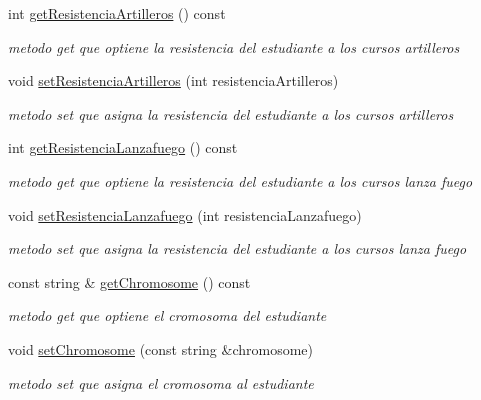 \begin{DoxyCompactItemize}
\mbox{\label{classEstudiantes_a4ee2603cd3b3ea6021ae72384f4a258f}} 
int \hyperlink{classEstudiantes_a4ee2603cd3b3ea6021ae72384f4a258f}{get\+Resistencia\+Artilleros} () const
\begin{DoxyCompactList}\small\item\em metodo get que optiene la resistencia del estudiante a los cursos artilleros \end{DoxyCompactList}\item 
\mbox{\label{classEstudiantes_a55e46054c075209ae207dfac6b3e2054}} 
void \hyperlink{classEstudiantes_a55e46054c075209ae207dfac6b3e2054}{set\+Resistencia\+Artilleros} (int resistencia\+Artilleros)
\begin{DoxyCompactList}\small\item\em metodo set que asigna la resistencia del estudiante a los cursos artilleros \end{DoxyCompactList}\item 
\mbox{\label{classEstudiantes_afbffcf98ee6826174f38453936b93b27}} 
int \hyperlink{classEstudiantes_afbffcf98ee6826174f38453936b93b27}{get\+Resistencia\+Lanzafuego} () const
\begin{DoxyCompactList}\small\item\em metodo get que optiene la resistencia del estudiante a los cursos lanza fuego \end{DoxyCompactList}\item 
\mbox{\label{classEstudiantes_a2ba90eee4a78a334efa5ec0e4b6d427c}} 
void \hyperlink{classEstudiantes_a2ba90eee4a78a334efa5ec0e4b6d427c}{set\+Resistencia\+Lanzafuego} (int resistencia\+Lanzafuego)
\begin{DoxyCompactList}\small\item\em metodo set que asigna la resistencia del estudiante a los cursos lanza fuego \end{DoxyCompactList}\item 
\mbox{\label{classEstudiantes_a74d16f90ce99a2a166e2eb8cdc3f77b5}} 
const string \& \hyperlink{classEstudiantes_a74d16f90ce99a2a166e2eb8cdc3f77b5}{get\+Chromosome} () const
\begin{DoxyCompactList}\small\item\em metodo get que optiene el cromosoma del estudiante \end{DoxyCompactList}\item 
\mbox{\label{classEstudiantes_a4c9b990503f42eab3e5a2792bc71eb1a}} 
void \hyperlink{classEstudiantes_a4c9b990503f42eab3e5a2792bc71eb1a}{set\+Chromosome} (const string \&chromosome)
\begin{DoxyCompactList}\small\item\em metodo set que asigna el cromosoma al estudiante \end{DoxyCompactList}\end{DoxyCompactItemize}
